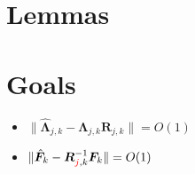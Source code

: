 \documentclass{article}
\numberwithin{equation}{section}
\begin{document}






\clearpage
\section{Lemmas}


\section{Goals}
\begin{itemize}
	\item $\lVert \hat{\bm{\Lambda}}_{j,k} - \bm{\Lambda}_{j,k}\bm{R}_{j,k} \rVert = O(1)$
	\item $\lVert \hat{\bm{F}}_{k} - \bm{R}^{-1}_{\textcolor{red}{j},k}\bm{F}_{k} \rVert = O(1)$
\end{itemize}
\end{document}
